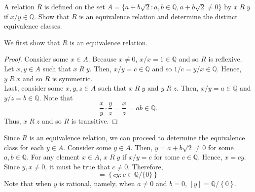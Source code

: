 \documentclass[12pt]{article}
\newcommand{\Q}{\mathbb{Q}}
\newenvironment{problem}[2][Problem]{\begin{trivlist}
		\item[\hskip \labelsep {\bfseries #1}\hskip \labelsep {\bfseries #2.}]}{\end{trivlist}}
\newenvironment{solution}[2][Solution]{\begin{trivlist}
		\item[\hskip \labelsep {\bfseries #1}\hskip \labelsep {\bfseries #2.}]}{\end{trivlist}}
\begin{document}
	\begin{problem}{32}
		A relation $R$ is defined on the set $A=\{a+b\sqrt{2}:a,b\in \Q, a+b\sqrt{2}\neq 0\}$ by $x\; R \; y$ if $x/y \in \Q$. Show that $R$ is an equivalence relation and determine the distinct equivalence classes.
		\begin{solution}{32}
			We first show that $R$ is an equivalence relation. 
			\begin{proof}
				Consider some $x\in A$. Because $x\neq 0$, $x/x = 1 \in \Q$ and so $R$ is reflexive. \\
				Let $x,y\in A$ such that $x\; R \;y$. Then, $x/y=c\in \Q$ and so $1/c = y/x \in \Q$. Hence, $y\; R \; x$ and so $R$ is symmetric.\\
				Last, consider some $x,y,z\in A$ such that $x\; R \;y$ and $y\; R \;z$. Then, $x/y = a \in \Q$ and $y/z = b \in \Q$. Note that
				\begin{equation*}
					\frac{x}{y} \cdot \frac{y}{z} = \frac{x}{z} = ab \in \Q.
				\end{equation*}
			Thus, $x\; R \; z$ and so $R$ is transitive.
			\end{proof}
			Since $R$ is an equivalence relation, we can proceed to determine the equivalence class for each $y\in A$. Consider some $y\in A$. Then, $y=a+b\sqrt{2}\neq 0$ for some $a,b\in \Q$. For any element $x\in A$, $x\; R \; y$ if $x/y = c$ for some $c\in \Q$. Hence, $x = cy$. Since $y,x\neq 0$, it must be true that $c \neq 0$. Therefore,
			\begin{equation*}
				[y] = \left\{cy:c\in \Q/\{0\}\right\}
			\end{equation*}
		Note that when $y$ is rational, namely, when $a \neq 0$ and $b=0$, $[y] =\Q/\left\{0\right\}$. 
		\end{solution}	
	\end{problem}
\end{document}
